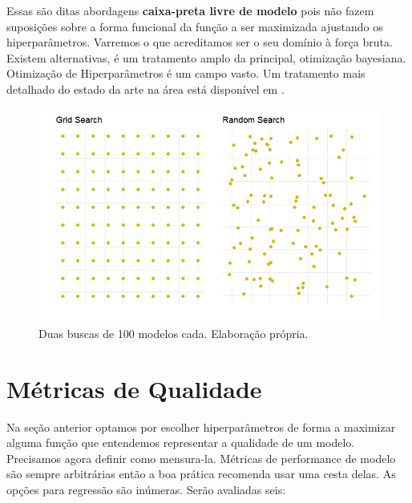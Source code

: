 Essas são ditas abordagens \textbf{caixa-preta livre de modelo} pois não fazem suposições sobre a forma funcional da função a ser maximizada ajustando os hiperparâmetros. Varremos o que acreditamos ser o seu domínio à força bruta. Existem alternativas,  é um tratamento amplo da principal, otimização bayesiana. Otimização de Hiperparâmetros é um campo vasto. Um tratamento mais detalhado do estado da arte na área está disponível em .


\begin{figure}[H]
    \centering
    \includegraphics[scale = .75]{imagens/random_grid.png}
    \caption{Duas buscas de 100 modelos cada. Elaboração própria.}
\end{figure}

\section{Métricas de Qualidade}

Na seção anterior optamos por escolher hiperparâmetros de forma a maximizar alguma função que entendemos representar a qualidade de um modelo. Precisamos agora definir como mensura-la. Métricas de performance de modelo são sempre arbitrárias então a boa prática recomenda usar uma cesta delas. As opções para regressão são inúmeras. Serão avaliadas seis:

